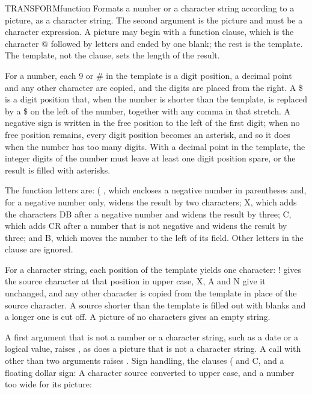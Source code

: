 \begin{XbaseEntry}{TRANSFORM}{function}
Formats a number or a character string according to a picture, as a character string.
\Syntax
{}
\Usage
The second argument is the picture and must be a character expression. A picture may begin with a function clause, which is the character @ followed by letters and ended by one blank; the rest is the template. The template, not the clause, sets the length of the result.

For a number, each 9 or \# in the template is a digit position, a decimal point and any other character are copied, and the digits are placed from the right. A \$ is a digit position that, when the number is shorter than the template, is replaced by a \$ on the left of the number, together with any comma in that stretch. A negative sign is written in the free position to the left of the first digit; when no free position remains, every digit position becomes an asterisk, and so it does when the number has too many digits. With a decimal point in the template, the integer digits of the number must leave at least one digit position spare, or the result is filled with asterisks.

The function letters are: ( , which encloses a negative number in parentheses and, for a negative number only, widens the result by two characters; X, which adds the characters DB after a negative number and widens the result by three; C, which adds CR after a number that is not negative and widens the result by three; and B, which moves the number to the left of its field. Other letters in the clause are ignored.

For a character string, each position of the template yields one character: ! gives the source character at that position in upper case, X, A and N give it unchanged, and any other character is copied from the template in place of the source character. A source shorter than the template is filled out with blanks and a longer one is cut off. A picture of no characters gives an empty string.

A first argument that is not a number or a character string, such as a date or a logical value, raises , as does a picture that is not a character string. A call with other than two arguments raises .
\Examples
Sign handling, the clauses ( and C, and a floating dollar sign:
A character source converted to upper case, and a number too wide for its picture:
\end{XbaseEntry}

